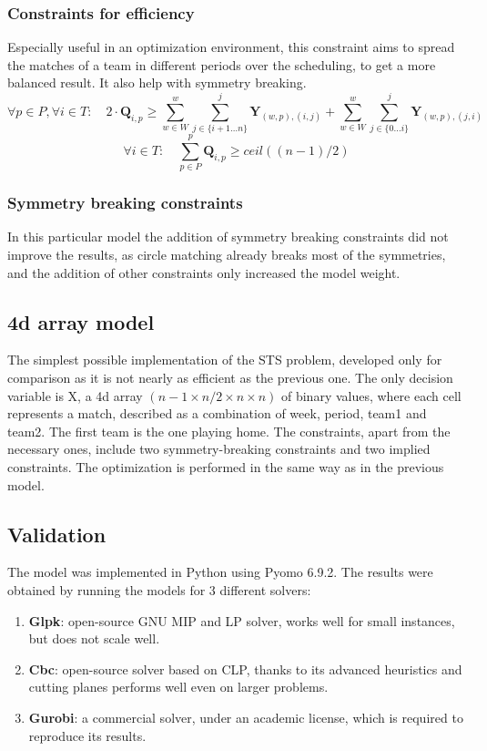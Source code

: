 \subsubsection*{Constraints for efficiency}
Especially useful in an optimization environment, this constraint aims to spread the matches of a team in different periods over the scheduling, to get a more balanced result. It also help with symmetry breaking.
\[
    \forall p \in P, \forall i \in T: \quad 2 \cdot \textbf{Q}_{i,p} \geq 
    \sum_{w \in W}^{w}\sum_{j \in \{i+1\dots n\}}^{j} \textbf{Y}_{(w,p), (i,j)} + 
    \sum_{w \in W}^{w}\sum_{j \in \{0\dots i\}}^{j} \textbf{Y}_{(w,p), (j,i)}
\]
\[
    \forall i \in T: \quad \sum_{p \in P}^p \textbf{Q}_{i,p} \geq ceil((n-1)/2)
\]
\subsubsection*{Symmetry breaking constraints}
In this particular model the addition of symmetry breaking constraints did not improve the results, as circle matching already breaks most of the symmetries, and the addition of other constraints only increased the model weight.

\subsection{4d array model}
The simplest possible implementation of the STS problem, developed only for comparison as it is not nearly as efficient as the previous one.
The only decision variable is X, a 4d array $(n-1 \times n/2 \times n \times n)$ of binary values, where each cell represents a match, described as a combination of week, period, team1 and team2. The first team is the one playing home.
The constraints, apart from the necessary ones, include two symmetry-breaking constraints and two implied constraints.
The optimization is performed in the same way as in the previous model.

\subsection{Validation}
The model was implemented in Python using Pyomo 6.9.2. 
The results were obtained by running the models for 3 different solvers:
\begin{enumerate}
    \item \textbf{Glpk}: open-source GNU MIP and LP solver, works well for small instances, but does not scale well.
    \item \textbf{Cbc}: open-source solver based on CLP, thanks to its advanced heuristics and cutting planes performs well even on larger problems.
    \item \textbf{Gurobi}: a commercial solver, under an academic license, which is required to reproduce its results.
\end{enumerate}

